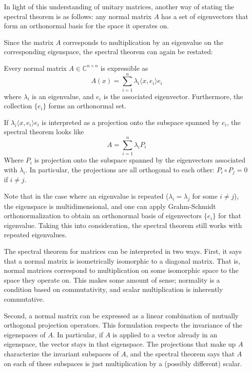 In light of this understanding of unitary matrices, another way of stating the
spectral theorem is as follows: any normal matrix $A$ has a set of eigenvectors
that form an orthonormal basis for the space it operates on.

Since the matrix $A$ corresponds to multiplication by an eigenvalue on the
corresponding eigenspace, the spectral theorem can again be restated:
\begin{theorem}
    Every normal matrix $A\in\mathbb{C}^{n\times n}$ is expressible as
    \[
        A(x) = \sum_{i=1}^n \lambda_i \langle x,e_i\rangle e_i
        \]
    where $\lambda_i$ is an eigenvalue, and $e_i$ is the associated
    eigenvector. Furthermore, the collection $\{e_i\}$ forms an orthonormal set.
\end{theorem}

If $\lambda_i \langle x,e_i\rangle e_i$ is interpreted as a projection onto the
subspace spanned by $e_i$, the spectral theorem looks like
\[
    A = \sum_{i=1}^n \lambda_i P_i
    \]
Where $P_i$ is projection onto the subspace spanned by the eigenvectors
associated with $\lambda_i$. In particular, the projections are all orthogonal
to each other: $P_i\circ P_j = 0$ if $i\not = j$.

Note that in the case where an eigenvalue is repeated ($\lambda_i = \lambda_j$
for some $i\not= j$), the eigenspace is multidimensional, and one can apply
Grahm-Schmidt orthonormalization to obtain an orthonormal basis of eigenvectors
$\{e_i\}$ for that eigenvalue. Taking this into consideration, the spectral
theorem still works with repeated eigenvalues.

The spectral theorem for matrices can be interpreted in two ways. First, it says
that a normal matrix is isometrically isomorphic to a diagonal matrix. That is,
normal matrices correspond to multiplication on some isomorphic space to the
space they operate on. This makes some amount of sense; normality is a condition
based on commutativity, and scalar multiplication is inherently commutative.

Second, a normal matrix can be expressed as a linear combination of mutually
orthogonal projection operators. This formulation respects the invariance of the
eigenspaces of $A$.  In particular, if $A$ is applied to a vector already in an
eigenspace, the vector stays in that eigenspace. The projections that make up
$A$ characterize the invariant subspaces of $A$, and the spectral theorem says
that $A$ on each of these subspaces is just multiplication by a (possibly
different) scalar.

